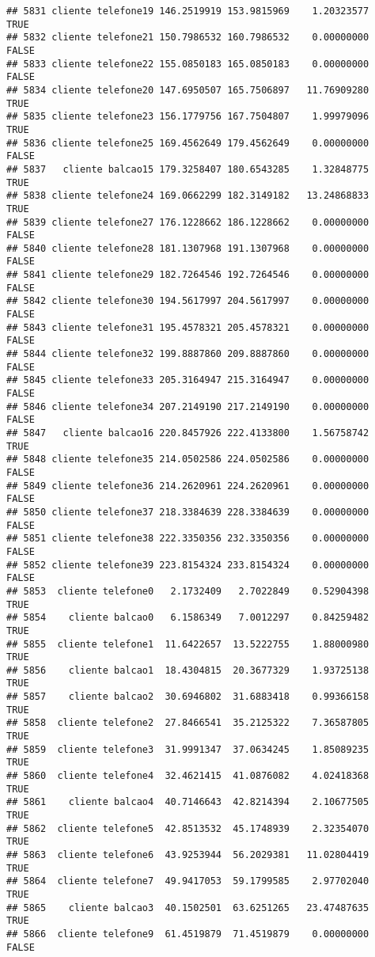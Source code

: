 \documentclass[
]{article}
\begin{document}
\begin{verbatim}
## 5831 cliente telefone19 146.2519919 153.9815969    1.20323577     TRUE
## 5832 cliente telefone21 150.7986532 160.7986532    0.00000000    FALSE
## 5833 cliente telefone22 155.0850183 165.0850183    0.00000000    FALSE
## 5834 cliente telefone20 147.6950507 165.7506897   11.76909280     TRUE
## 5835 cliente telefone23 156.1779756 167.7504807    1.99979096     TRUE
## 5836 cliente telefone25 169.4562649 179.4562649    0.00000000    FALSE
## 5837   cliente balcao15 179.3258407 180.6543285    1.32848775     TRUE
## 5838 cliente telefone24 169.0662299 182.3149182   13.24868833     TRUE
## 5839 cliente telefone27 176.1228662 186.1228662    0.00000000    FALSE
## 5840 cliente telefone28 181.1307968 191.1307968    0.00000000    FALSE
## 5841 cliente telefone29 182.7264546 192.7264546    0.00000000    FALSE
## 5842 cliente telefone30 194.5617997 204.5617997    0.00000000    FALSE
## 5843 cliente telefone31 195.4578321 205.4578321    0.00000000    FALSE
## 5844 cliente telefone32 199.8887860 209.8887860    0.00000000    FALSE
## 5845 cliente telefone33 205.3164947 215.3164947    0.00000000    FALSE
## 5846 cliente telefone34 207.2149190 217.2149190    0.00000000    FALSE
## 5847   cliente balcao16 220.8457926 222.4133800    1.56758742     TRUE
## 5848 cliente telefone35 214.0502586 224.0502586    0.00000000    FALSE
## 5849 cliente telefone36 214.2620961 224.2620961    0.00000000    FALSE
## 5850 cliente telefone37 218.3384639 228.3384639    0.00000000    FALSE
## 5851 cliente telefone38 222.3350356 232.3350356    0.00000000    FALSE
## 5852 cliente telefone39 223.8154324 233.8154324    0.00000000    FALSE
## 5853  cliente telefone0   2.1732409   2.7022849    0.52904398     TRUE
## 5854    cliente balcao0   6.1586349   7.0012297    0.84259482     TRUE
## 5855  cliente telefone1  11.6422657  13.5222755    1.88000980     TRUE
## 5856    cliente balcao1  18.4304815  20.3677329    1.93725138     TRUE
## 5857    cliente balcao2  30.6946802  31.6883418    0.99366158     TRUE
## 5858  cliente telefone2  27.8466541  35.2125322    7.36587805     TRUE
## 5859  cliente telefone3  31.9991347  37.0634245    1.85089235     TRUE
## 5860  cliente telefone4  32.4621415  41.0876082    4.02418368     TRUE
## 5861    cliente balcao4  40.7146643  42.8214394    2.10677505     TRUE
## 5862  cliente telefone5  42.8513532  45.1748939    2.32354070     TRUE
## 5863  cliente telefone6  43.9253944  56.2029381   11.02804419     TRUE
## 5864  cliente telefone7  49.9417053  59.1799585    2.97702040     TRUE
## 5865    cliente balcao3  40.1502501  63.6251265   23.47487635     TRUE
## 5866  cliente telefone9  61.4519879  71.4519879    0.00000000    FALSE

\end{verbatim}
\end{document}
